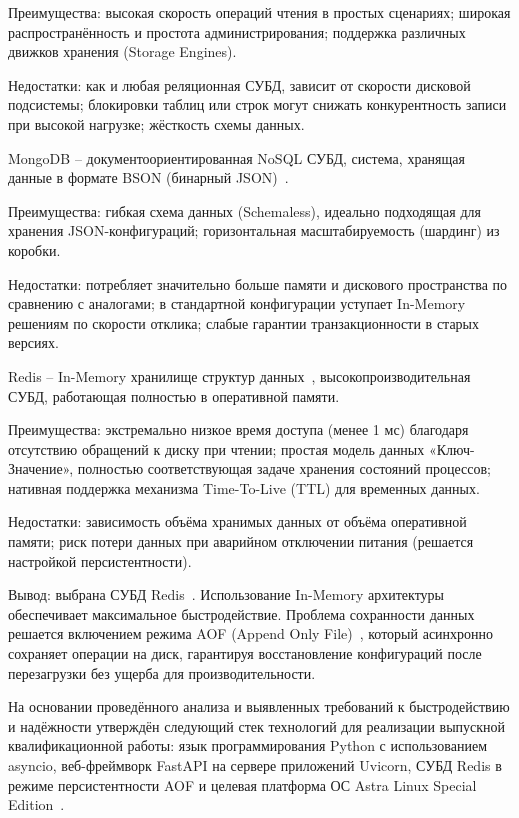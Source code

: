 Преимущества: высокая скорость операций чтения в простых сценариях; широкая распространённость и простота администрирования; поддержка различных движков хранения (Storage Engines).

Недостатки: как и любая реляционная СУБД, зависит от скорости дисковой подсистемы; блокировки таблиц или строк могут снижать конкурентность записи при высокой нагрузке; жёсткость схемы данных.

MongoDB -- документоориентированная NoSQL СУБД, система, хранящая данные в формате BSON (бинарный JSON)~\cite{sadalage-nosql}.

Преимущества: гибкая схема данных (Schemaless), идеально подходящая для хранения JSON-конфигураций; горизонтальная масштабируемость (шардинг) из коробки.

Недостатки: потребляет значительно больше памяти и дискового пространства по сравнению с аналогами; в стандартной конфигурации уступает In-Memory решениям по скорости отклика; слабые гарантии транзакционности в старых версиях.

Redis -- In-Memory хранилище структур данных~\cite{redis-docs, macedo-redis}, высокопроизводительная СУБД, работающая полностью в оперативной памяти.

Преимущества: экстремально низкое время доступа (менее 1 мс) благодаря отсутствию обращений к диску при чтении; простая модель данных «Ключ-Значение», полностью соответствующая задаче хранения состояний процессов; нативная поддержка механизма Time-To-Live (TTL) для временных данных.

Недостатки: зависимость объёма хранимых данных от объёма оперативной памяти; риск потери данных при аварийном отключении питания (решается настройкой персистентности).

Вывод: выбрана СУБД Redis~\cite{redis-docs}. Использование In-Memory архитектуры обеспечивает максимальное быстродействие. Проблема сохранности данных решается включением режима AOF (Append Only File)~\cite{redis-aof, kleppmann-ddia}, который асинхронно сохраняет операции на диск, гарантируя восстановление конфигураций после перезагрузки без ущерба для производительности.


На основании проведённого анализа и выявленных требований к быстродействию и надёжности утверждён следующий стек технологий для реализации выпускной квалификационной работы: язык программирования Python с использованием asyncio, веб-фреймворк FastAPI на сервере приложений Uvicorn, СУБД Redis в режиме персистентности AOF и целевая платформа ОС Astra Linux Special Edition~\cite{astra-linux}.

